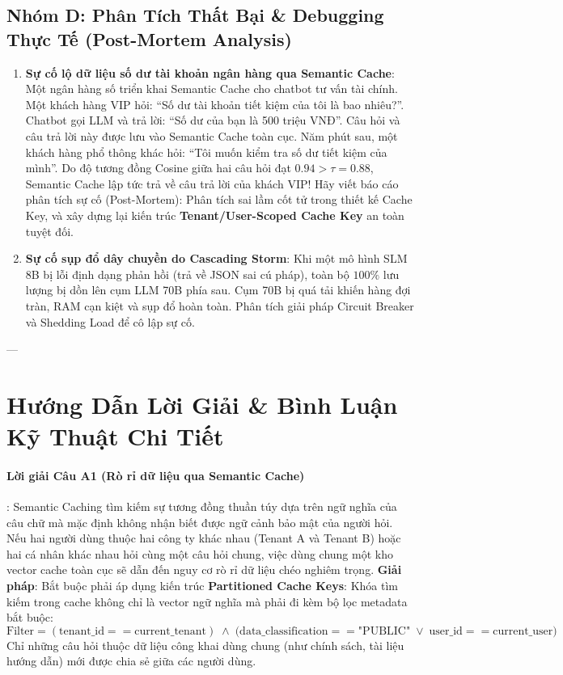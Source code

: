 \subsection{Nhóm D: Phân Tích Thất Bại \& Debugging Thực Tế (Post-Mortem Analysis)}

\begin{enumerate}[label=\textbf{D\arabic*.}]
  \item \textbf{Sự cố lộ dữ liệu số dư tài khoản ngân hàng qua Semantic Cache}:
  Một ngân hàng số triển khai Semantic Cache cho chatbot tư vấn tài chính.
  Một khách hàng VIP hỏi: ``Số dư tài khoản tiết kiệm của tôi là bao nhiêu?''. Chatbot gọi LLM và trả lời: ``Số dư của bạn là 500 triệu VNĐ''. Câu hỏi và câu trả lời này được lưu vào Semantic Cache toàn cục.
  Năm phút sau, một khách hàng phổ thông khác hỏi: ``Tôi muốn kiểm tra số dư tiết kiệm của mình''.
  Do độ tương đồng Cosine giữa hai câu hỏi đạt $0.94 > \tau = 0.88$, Semantic Cache lập tức trả về câu trả lời của khách VIP!
  Hãy viết báo cáo phân tích sự cố (Post-Mortem): Phân tích sai lầm cốt tử trong thiết kế Cache Key, và xây dựng lại kiến trúc \textbf{Tenant/User-Scoped Cache Key} an toàn tuyệt đối.
  \item \textbf{Sự cố sụp đổ dây chuyền do Cascading Storm}:
  Khi một mô hình SLM 8B bị lỗi định dạng phản hồi (trả về JSON sai cú pháp), toàn bộ $100\%$ lưu lượng bị dồn lên cụm LLM 70B phía sau. Cụm 70B bị quá tải khiến hàng đợi tràn, RAM cạn kiệt và sụp đổ hoàn toàn. Phân tích giải pháp Circuit Breaker và Shedding Load để cô lập sự cố.
\end{enumerate}

---

\section{Hướng Dẫn Lời Giải \& Bình Luận Kỹ Thuật Chi Tiết}
\label{sec:ch13-solutions}

\paragraph{Lời giải Câu A1 (Rò rỉ dữ liệu qua Semantic Cache)}:
Semantic Caching tìm kiếm sự tương đồng thuần túy dựa trên ngữ nghĩa của câu chữ mà mặc định không nhận biết được ngữ cảnh bảo mật của người hỏi.
Nếu hai người dùng thuộc hai công ty khác nhau (Tenant A và Tenant B) hoặc hai cá nhân khác nhau hỏi cùng một câu hỏi chung, việc dùng chung một kho vector cache toàn cục sẽ dẫn đến nguy cơ rò rỉ dữ liệu chéo nghiêm trọng.
\textbf{Giải pháp}: Bắt buộc phải áp dụng kiến trúc \textbf{Partitioned Cache Keys}:
Khóa tìm kiếm trong cache không chỉ là vector ngữ nghĩa mà phải đi kèm bộ lọc metadata bắt buộc:
\begin{equation*}
\text{Filter} = (\text{tenant\_id} == \text{current\_tenant}) \;\land\; \Big( \text{data\_classification} == \text{"PUBLIC"} \;\lor\; \text{user\_id} == \text{current\_user} \Big)
\end{equation*}
Chỉ những câu hỏi thuộc dữ liệu công khai dùng chung (như chính sách, tài liệu hướng dẫn) mới được chia sẻ giữa các người dùng.

